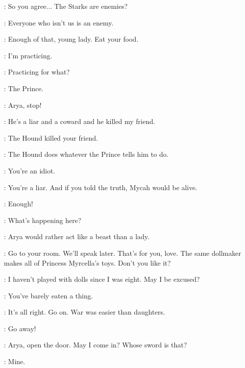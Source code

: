 \JOFFREY: So you agree$\ldots$ The Starks are enemies? 

\CERSEI: Everyone who isn't us is an enemy. 

\scene



\SEPTAMORDANE: Enough of that, young lady. Eat your food. 

\ARYA: I'm practicing. 

\SANSA: Practicing for what? 

\ARYA: The Prince. 

\SEPTAMORDANE: Arya, stop! 

\ARYA: He's a liar and a coward and he killed my friend. 

\SANSA: The Hound killed your friend. 

\ARYA: The Hound does whatever the Prince tells him to do. 

\SANSA: You're an idiot. 

\ARYA: You're a liar. And if you told the truth, Mycah would be alive. 

\SEPTAMORDANE: Enough! 


\NED: What's happening here? 

\SEPTAMORDANE: Arya would rather act like a beast than a lady. 

\NED: Go to your room. We'll speak later.  That's for you, love. The same dollmaker makes all of Princess Myrcella's toys. Don't you like it? 

\SANSA: I haven't played with dolls since I was eight. May I be excused? 

\SEPTAMORDANE: You've barely eaten a thing. 

\NED: It's all right. Go on.  War was easier than daughters. 


\scene




\ARYA: Go away! 

\NED: Arya, open the door. May I come in?   Whose sword is that? 

\ARYA: Mine. 

